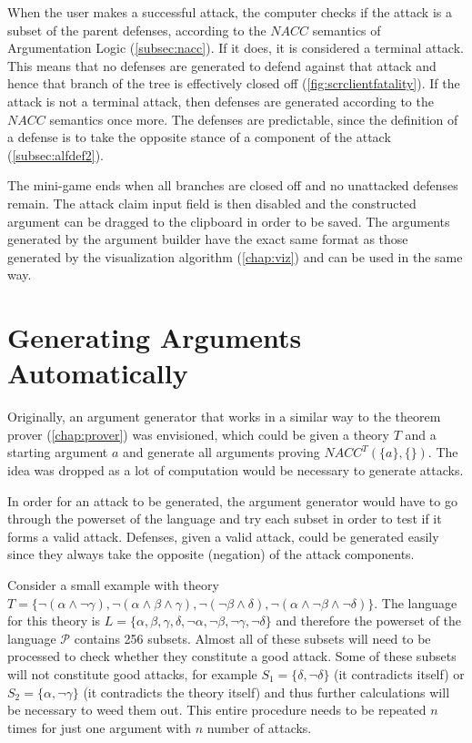 \documentclass[11pt,twoside,a4paper]{report}
\begin{document}
When the user makes a successful attack, the computer checks if the attack is a subset of the parent defenses, according to the $NACC$ semantics of Argumentation Logic (\autoref{subsec:nacc}). If it does, it is considered a terminal attack. This means that no defenses are generated to defend against that attack and hence that branch of the tree is effectively closed off (\autoref{fig:scrclientfatality}). If the attack is not a terminal attack, then defenses are generated according to the $NACC$ semantics once more. The defenses are predictable, since the definition of a defense is to take the opposite stance of a component of the attack (\autoref{subsec:alfdef2}).

The mini-game ends when all branches are closed off and no unattacked defenses remain. The attack claim input field is then disabled and the constructed argument can be dragged to the clipboard in order to be saved. The arguments generated by the argument builder have the exact same format as those generated by the visualization algorithm (\autoref{chap:viz}) and can be used in the same way.

\section{Generating Arguments Automatically}
Originally, an argument generator that works in a similar way to the theorem prover (\autoref{chap:prover}) was envisioned, which could be given a theory $T$ and a starting argument $a$ and generate all arguments proving $NACC^T(\{a\},\{ \})$. The idea was dropped as a lot of computation would be necessary to generate attacks.

In order for an attack to be generated, the argument generator would have to go through the powerset of the language and try each subset in order to test if it forms a valid attack. Defenses, given a valid attack, could be generated easily since they always take the opposite (negation) of the attack components.

Consider a small example with theory $T = \{\neg(\alpha\wedge\neg\gamma), \neg(\alpha\wedge\beta\wedge\gamma), \neg(\neg\beta\wedge\delta), \neg(\alpha\wedge\neg\beta\wedge\neg\delta)\}$. The language for this theory is $L = \{\alpha, \beta, \gamma, \delta, \neg\alpha, \neg\beta, \neg\gamma, \neg\delta\}$ and therefore the powerset of the language $\mathcal{P}$ contains 256 subsets. Almost all of these subsets will need to be processed to check whether they constitute a good attack. Some of these subsets will not constitute good attacks, for example $S_1 = \{\delta, \neg\delta\}$ (it contradicts itself) or $S_2 = \{\alpha, \neg\gamma\}$ (it contradicts the theory itself) and thus further calculations will be necessary to weed them out. This entire procedure needs to be repeated $n$ times for just one argument with $n$ number of attacks.
\end{document}
